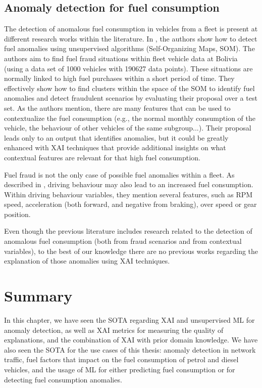 \subsection{Anomaly detection for fuel consumption}\label{subsec:ch2-sota-anomaly-fuel}
The detection of anomalous fuel consumption in vehicles from a fleet is present at different research works within the literature. In \parencite{aquize2017self}, the authors show how to detect fuel anomalies using unsupervised algorithms (Self-Organizing Maps, SOM). The authors aim to find fuel fraud situations within fleet vehicle data at Bolivia (using a data set of 1000 vehicles with 190627 data points). These situations are normally linked to high fuel purchases within a short period of time. They effectively show how to find clusters within the space of the SOM to identify fuel anomalies and detect fraudulent scenarios by evaluating their proposal over a test set. As the authors mention, there are many features that can be used to contextualize the fuel consumption (e.g., the normal monthly consumption of the vehicle, the behaviour of other vehicles of the same subgroup...). Their proposal leads only to an output that identifies anomalies, but it could be greatly enhanced with XAI techniques that provide additional insights on what contextual features are relevant for that high fuel consumption.

Fuel fraud is not the only case of possible fuel anomalies within a fleet. As described in \parencite{zhang2017safedrive}, driving behaviour may also lead to an increased fuel consumption. Within driving behaviour variables, they mention several features, such as RPM speed, acceleration (both forward, and negative from braking), over speed or gear position.

Even though the previous literature includes research related to the detection of anomalous fuel consumption (both from fraud scenarios and from contextual variables), to the best of our knowledge there are no previous works regarding the explanation of those anomalies using XAI techniques.

\section{Summary}\label{sec:ch2-sota-summary}
In this chapter, we have seen the SOTA regarding XAI and unsupervised ML for anomaly detection, as well as XAI metrics for measuring the quality of explanations, and the combination of XAI with prior domain knowledge. We have also seen the SOTA for the use cases of this thesis: anomaly detection in network traffic, fuel factors that impact on the fuel consumption of petrol and diesel vehicles, and the usage of ML for either predicting fuel consumption or for detecting fuel consumption anomalies.

